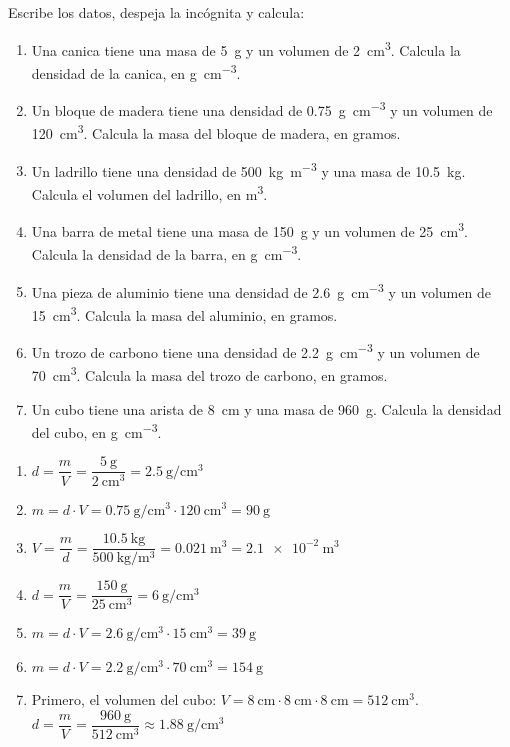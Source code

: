 \begin{exercise}
    Escribe los datos, despeja la incógnita y calcula:
    \begin{enumerate}[label=\letraminuscula]
        \item Una canica tiene una masa de \qty{5}{\g} y un volumen de \qty{2}{\cubic\cm}. Calcula la densidad de la canica, en \unit{\g\per\cubic\cm}.
        \item Un bloque de madera tiene una densidad de \qty{0.75}{\g\per\cubic\cm} y un volumen de \qty{120}{\cubic\cm}. Calcula la masa del bloque de madera, en gramos.
        \item Un ladrillo tiene una densidad de \qty{500}{\kg\per\cubic\m} y una masa de \qty{10.5}{\kg}. Calcula el volumen del ladrillo, en \unit{\cubic\m}.
        \item Una barra de metal tiene una masa de \qty{150}{\g} y un volumen de \qty{25}{\cubic\cm}. Calcula la densidad de la barra, en \unit{\g\per\cubic\cm}.
        \item Una pieza de aluminio tiene una densidad de \qty{2.6}{\g\per\cubic\cm} y un volumen de \qty{15}{\cubic\cm}. Calcula la masa del aluminio, en gramos.
        \item Un trozo de carbono tiene una densidad de \qty{2.2}{\g\per\cubic\cm} y un volumen de \qty{70}{\cubic\cm}. Calcula la masa del trozo de carbono, en gramos.
        \item Un cubo tiene una arista de \qty{8}{\cm} y una masa de \qty{960}{\g}. Calcula la densidad del cubo, en \unit{\g\per\cubic\cm}.
    \end{enumerate}
    \begin{solu}
        \begin{enumerate}[label=\alph*)]
            \item \(d = \dfrac{m}{V} = \dfrac{\qty{5}{\g}}{\qty{2}{\cubic\cm}} = \qty{2.5}{\g\per\cubic\cm}\)
            \item \(m = d \cdot V = \qty{0.75}{\g\per\cubic\cm} \cdot \qty{120}{\cubic\cm} = \qty{90}{\g}\)
            \item \(V = \dfrac{m}{d} = \dfrac{\qty{10.5}{\kg}}{\qty{500}{\kg\per\cubic\m}} = \qty{0.021}{\cubic\m} = \qty{2.1e-2}{\cubic\m}\)
            \item \(d = \dfrac{m}{V} = \dfrac{\qty{150}{\g}}{\qty{25}{\cubic\cm}} = \qty{6}{\g\per\cubic\cm}\)
            \item \(m = d \cdot V = \qty{2.6}{\g\per\cubic\cm} \cdot \qty{15}{\cubic\cm} = \qty{39}{\g}\)
            \item \(m = d \cdot V = \qty{2.2}{\g\per\cubic\cm} \cdot \qty{70}{\cubic\cm} = \qty{154}{\g}\)
            \item Primero, el volumen del cubo: \(V = \qty{8}{\cm} \cdot \qty{8}{\cm} \cdot \qty{8}{\cm} = \qty{512}{\cubic\cm}\). \\
            \(d = \dfrac{m}{V} = \dfrac{\qty{960}{\g}}{\qty{512}{\cubic\cm}} \approx \qty{1.88}{\g\per\cubic\cm}\)
        \end{enumerate}
    \end{solu}
\end{exercise}



